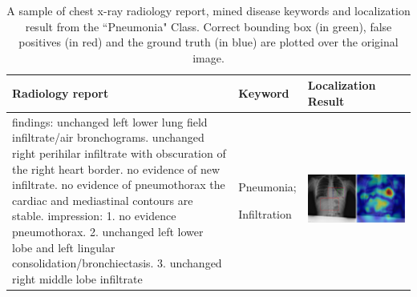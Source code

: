 \documentclass[10pt,twocolumn,letterpaper]{article}
\begin{document}
\begin{table}
	\begin{center}
		\begin{tabular}{p{15em}|p{6em}|p{23em}}
			\hline
			Radiology report & Keyword & Localization Result\\
			\hline\hline
			findings: unchanged left lower lung field infiltrate/air bronchograms.
			unchanged right perihilar infiltrate with obscuration of the right
			heart border. no evidence of new infiltrate. no evidence of
			pneumothorax the cardiac and mediastinal contours are stable.
			impression:
			1. no evidence pneumothorax.
			2. unchanged left lower lobe and left lingular
			consolidation/bronchiectasis.
			3. unchanged right middle lobe infiltrate 
			& Pneumonia;
			
			Infiltration
			&\vspace{0cm}\includegraphics[width=1\linewidth]{00008039_01_c_7.png} \\
			\hline
		\end{tabular}
	\end{center}
	\caption{A sample of chest x-ray radiology report, mined disease keywords and localization result from the ``Pneumonia" Class. Correct bounding box (in green), false positives (in red) and the ground truth (in blue) are plotted over the original image.}
	\label{tab:Loc_example_7}
\end{table}
\end{document}
